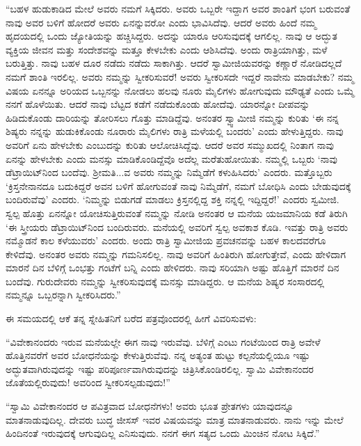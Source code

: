  “ಬಹಳ ಹುಡುಕಾಡಿದ ಮೇಲೆ ಅವರು ನಮಗೆ ಸಿಕ್ಕಿದರು. ಅವರು ಒಬ್ಬರೇ ಇದ್ದಾಗ ಅವರ ಶಾಂತಿಗೆ ಭಂಗ ಬರುವಂತೆ ನಾವು ಅವರ ಬಳಿಗೆ ಹೋದರೆ ಅವರು ಏನನ್ನುವರೋ ಎಂದು ಭಾವಿಸಿದೆವು. ಆದರೆ ಅವರು ಹಿಂದೆ ನಮ್ಮ ಹೃದಯದಲ್ಲಿ ಒಂದು ಜ್ಯೋತಿಯನ್ನು ಹಚ್ಚಿಸಿದ್ದರು. ಅದನ್ನು ಯಾರೂ ಆರಿಸುವುದಕ್ಕೆ ಆಗಲಿಲ್ಲ. ನಾವು ಆ ಅದ್ಭುತ ವ್ಯಕ್ತಿಯ ಜೀವನ ಮತ್ತು ಸಂದೇಶವನ್ನು ಮತ್ತೂ ಕೇಳಬೇಕು ಎಂದು ಆಶಿಸಿದೆವು. ಅಂದು ರಾತ್ರಿಯಾಗಿತ್ತು, ಮಳೆ ಬರುತ್ತಿತ್ತು. ನಾವು ಬಹಳ ದೂರ ನಡೆದು ನಡೆದು ಸಾಕಾಗಿತ್ತು. ಆದರೆ ಸ್ವಾಮೀಜಿಯವರನ್ನು ಕಣ್ಣಾರೆ ನೋಡಿದಲ್ಲದೆ ನಮಗೆ ಶಾಂತಿ ಇರಲಿಲ್ಲ. ಅವರು ನಮ್ಮನ್ನು ಸ್ವೀಕರಿಸುವರೆ! ಅವರು ಸ್ವೀಕರಿಸದೇ ಇದ್ದರೆ ನಾವೇನು ಮಾಡಬೇಕು? ನಮ್ಮ ವಿಷಯ ಏನನ್ನೂ ಅರಿಯದ ಒಬ್ಬನನ್ನು ನೋಡಲು ಹಲವು ನೂರು ಮೈಲಿಗಳು ಹೋಗುವುದು ಮೌಢ್ಯತೆ ಎಂದು ಒಮ್ಮೆ ನನಗೆ ಹೊಳೆಯಿತು. ಆದರೆ ನಾವು ಬೆಟ್ಟದ ಕಡೆಗೆ ನಡೆದುಕೊಂಡು ಹೋದೆವು. ಯಾರನ್ನೋ ದೀಪವನ್ನು ಹಿಡಿದುಕೊಂಡು ದಾರಿಯನ್ನು ತೋರಿಸಲು ಗೊತ್ತು ಮಾಡಿದ್ದೆವು. ಅನಂತರ ಸ್ವ್ವಾಮೀಜಿ ನಮ್ಮನ್ನು ಕುರಿತು ‘ಈ ನನ್ನ ಶಿಷ್ಯರು ನನ್ನನ್ನು ಹುಡುಕಿಕೊಂಡು ನೂರಾರು ಮೈಲಿಗಳು ರಾತ್ರಿ ಮಳೆಯಲ್ಲಿ ಬಂದರು’ ಎಂದು ಹೇಳುತ್ತಿದ್ದರು. ನಾವು ಅವರಿಗೆ ಏನು ಹೇಳಬೇಕು ಎಂಬುದನ್ನು ಕುರಿತು ಆಲೋಚಿಸಿದ್ದೆವು. ಆದರೆ ಅವರ ಸಮ್ಮುಖದಲ್ಲಿ ನಿಂತಾಗ ನಾವು ಏನನ್ನು ಹೇಳಬೇಕು ಎಂದು ಮನಸ್ಸು ಮಾಡಿಕೊಂಡಿದ್ದೆವೊ ಅದೆಲ್ಲ ಮರೆತುಹೋಯಿತು. ನಮ್ಮಲ್ಲಿ ಒಬ್ಬರು ‘ನಾವು ಡೆಟ್ರಾಯಿಟ್‍ನಿಂದ ಬಂದೆವು. ಶ‍್ರೀಮತಿ...ವ ಅವರು ನಮ್ಮನ್ನು ನಿಮ್ಮೆಡೆಗೆ ಕಳುಹಿಸಿದರು’ ಎಂದರು. ಮತ್ತೊಬ್ಬರು ‘ಕ್ರಿಸ್ತನೇನಾನದೂ ಬದುಕಿದ್ದರೆ ಅವನ ಬಳಿಗೆ ಹೋಗುವಂತೆ ನಾವು ನಿಮ್ಮೆಡೆಗೆ, ನಮಗೆ ಬೋಧಿಸಿ ಎಂದು ಬೇಡುವುದಕ್ಕೆ ಬಂದಿರುವೆವು’ ಎಂದರು. ‘ನಿಮ್ಮನ್ನು ಬಿಡುಗಡೆ ಮಾಡಲು ಕ್ರಿಸ್ತನಲ್ಲಿದ್ದ ಶಕ್ತಿ ನನ್ನಲ್ಲಿ ಇದ್ದಿದ್ದರೆ!’ ಎಂದರು ಸ್ವಮೀಜಿ. ಸ್ವಲ್ಪ ಹೊತ್ತು ಏನನ್ನೋ ಯೋಚಿಸುತ್ತಿರುವಂತೆ ನಮ್ಮನ್ನು ನೋಡಿ ಅನಂತರ ಆ ಮನೆಯ ಯಜಮಾನಿಯ ಕಡೆ ತಿರುಗಿ ‘ಈ ಸ್ತ್ರೀಯರು ಡೆಟ್ರಾಯಿಟ್‍ನಿಂದ ಬಂದಿರುವರು. ಮನೆಯಲ್ಲಿ ಅವರಿಗೆ ಸ್ವಲ್ಪ ಅವಕಾಶ ಕೊಡಿ. ಇವತ್ತು ರಾತ್ರಿ ಅವರು ನಮ್ಮೊಡನೆ ಕಾಲ ಕಳೆಯುವರು’ ಎಂದರು. ಅಂದು ರಾತ್ರಿ ಸ್ವಾಮೀಜಿಯ ಪ್ರವಚನವನ್ನು ಬಹಳ ಕಾಲದವರೆಗೂ ಕೇಳಿದೆವು. ಅನಂತರ ಅವರು ನಮ್ಮನ್ನು ಗಮನಿಸಲಿಲ್ಲ. ನಾವು ಅವರಿಗೆ ಹಿಂತಿರುಗಿ ಹೋಗುತ್ತೇವೆ, ಎಂದು ಹೇಳಿದಾಗ ಮಾರನೆ ದಿನ ಬೆಳಿಗ್ಗೆ ಒಂಭತ್ತು ಗಂಟೆಗೆ ಬನ್ನಿ ಎಂದು ಹೇಳಿದರು. ನಾವು ಸರಿಯಾಗಿ ಅಷ್ಟು ಹೊತ್ತಿಗೆ ಮಾರನೆ ದಿನ ಬಂದೆವು. ಗುರುದೇವರು ನಮ್ಮನ್ನು ಸ್ವೀಕರಿಸುವುದಕ್ಕೆ ಮನಸ್ಸು ಮಾಡಿದ್ದರು. ಆ ಮನೆಯ ಶಿಷ್ಯರ ಸಂಸಾರದಲ್ಲಿ ನಮ್ಮನ್ನೂ ಒಬ್ಬರನ್ನಾಗಿ ಸ್ವೀಕರಿಸಿದರು.” 

 ಈ ಸಮಯದಲ್ಲಿ ಆಕೆ ತನ್ನ ಸ್ನೇಹಿತನಿಗೆ ಬರೆದ ಪತ್ರವೊಂದರಲ್ಲಿ ಹೀಗೆ ವಿವರಿಸುವಳು: 

 “ವಿವೇಕಾನಂದರು ಇರುವ ಮನೆಯಲ್ಲೇ ಈಗ ನಾವು ಇರುವೆವು. ಬೆಳಿಗ್ಗೆ ಎಂಟು ಗಂಟೆಯಿಂದ ರಾತ್ರಿ ಅವೇಳೆ ಹೊತ್ತಿನವರೆಗೆ ಅವರ ಬೋಧನೆಯನ್ನು ಕೇಳುತ್ತಿರುವೆವು. ನನ್ನ ಅತ್ಯಂತ ಹುಟ್ಟು ಕಲ್ಪನೆಯಲ್ಲಿಯೂ ಇಷ್ಟು ಅದ್ಭುತವಾಗಿರುವುದನ್ನು ಇಷ್ಟು ಪರಿಪೂರ್ಣವಾಗಿರುವುದನ್ನು ಚಿತ್ರಿಸಿಕೊಂಡಿರಲಿಲ್ಲ. ಸ್ವಾಮಿ ವಿವೇಕಾನಂದರ ಜೊತೆಯಲ್ಲಿರುವುದು! ಅವರಿಂದ ಸ್ವೀಕರಿಸಲ್ಪಡುವುದು!” 

 “ಸ್ವಾಮಿ ವಿವೇಕಾನಂದರ ಆ ಪವಿತ್ರವಾದ ಬೋಧನೆಗಳು! ಅವರು ಭೂತ ಪ್ರೇತಗಳು ಯಾವುದನ್ನೂ ಮಾತನಾಡುವುದಿಲ್ಲ. ದೇವರು ಬುದ್ಧ ಜೀಸಸ್ ಇವರ ವಿಷಯವನ್ನು ಮಾತ್ರ ಮಾತನಾಡುವರು. ನಾನು ಇನ್ನು ಮೇಲೆ ಹಿಂದಿನಂತೆ ಇರುವುದಕ್ಕೆ ಆಗುವುದಿಲ್ಲ ಎನಿಸುವುದು. ನನಗೆ ಈಗ ಸತ್ಯದ ಒಂದು ಮಿಂಚಿನ ನೋಟ ಸಿಕ್ಕಿದೆ.” 

